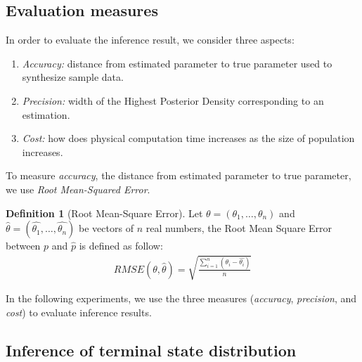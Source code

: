\documentclass[12pt]{article}
\theoremstyle{definition}
\newtheorem{definition}{Definition}[section]
\begin{document}
\subsection{Evaluation measures}
In order to evaluate the inference result, we consider three aspects:
\begin{enumerate}
\item \textit{Accuracy:} distance from estimated parameter to true parameter
  used to synthesize sample data.
\item \textit{Precision:} width of the Highest Posterior Density corresponding
  to an estimation.
\item \textit{Cost:} how does physical computation time increases as the size of
  population increases.
\end{enumerate}

To measure \textit{accuracy}, the distance from estimated parameter to true parameter, we use \textit{Root
Mean-Squared Error}.
\begin{definition}[Root Mean-Square Error]
  Let $\theta = (\theta_1,\ldots,\theta_n)$ and $\hat{\theta} =
  (\hat{\theta_1},\ldots,\hat{\theta_n})$ be vectors of $n$ real numbers, the
  Root Mean Square Error between $p$ and $\hat{p}$ is defined as follow:
  \begin{align*}
    RMSE(\theta, \hat{\theta}) = \sqrt{\frac{\sum_{i=1}^n{(\theta_i - \hat{\theta_i})}}{n}}
  \end{align*}

In the following experiments, we use the three measures (\textit{accuracy},
\textit{precision}, and \textit{cost}) to evaluate inference results.
\end{definition}

\subsection{Inference of terminal state distribution}
\end{document}
